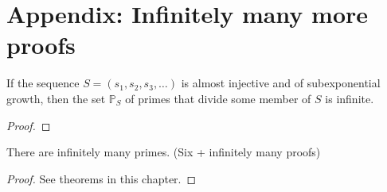 \section{Appendix: Infinitely many more proofs} \label{appendix:more_primes}
\begin{theorem}
    \label{thm:infty_proof}
    \leanok
    If the sequence \(S = (s_1, s_2, s_3, \dots)\) is almost injective and of subexponential growth,
    then the set \(\mathbb{P}_S\) of primes that divide some member of $S$ is infinite.
\end{theorem}
\begin{proof}
\end{proof}

\begin{theorem}
    \label{thm:infinity_of_primes}
    There are infinitely many primes. (Six + infinitely many proofs)
    \leanok
\end{theorem}
\begin{proof}
    See theorems in this chapter.
\end{proof}